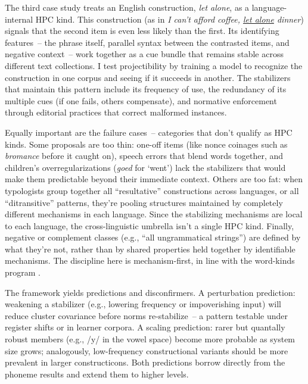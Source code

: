 \documentclass[12pt]{article}
\begin{document}
The third case study treats an English construction, \textit{let alone}, as a language-internal HPC kind. This construction (as in \textit{I can't afford coffee, \uline{let alone} dinner}) signals that the second item is even less likely than the first. Its identifying features~-- the phrase itself, parallel syntax between the contrasted items, and negative context~-- work together as a cue bundle that remains stable across different text collections. I test projectibility by training a model to recognize the construction in one corpus and seeing if it succeeds in another. The stabilizers that maintain this pattern include its frequency of use, the redundancy of its multiple cues (if one fails, others compensate), and normative enforcement through editorial practices that correct malformed instances.

Equally important are the failure cases~-- categories that don't qualify as HPC kinds. Some proposals are too thin: one-off items (like nonce coinages such as \textit{bromance} before it caught on), speech errors that blend words together, and children's overregularizations (\textit{goed} for `went') lack the stabilizers that would make them predictable beyond their immediate context. Others are too fat: when typologists group together all ``resultative'' constructions across languages, or all ``ditransitive'' patterns, they're pooling structures maintained by completely different mechanisms in each language. Since the stabilizing mechanisms are local to each language, the cross-linguistic umbrella isn't a single HPC kind. Finally, negative or complement classes (e.g., ``all ungrammatical strings'') are defined by what they're not, rather than by shared properties held together by identifiable mechanisms. The discipline here is mechanism-first, in line with the word-kinds program \citep{Miller2021WordsSpeciesKinds}.

The framework yields predictions and disconfirmers. A perturbation prediction: weakening a stabilizer (e.g., lowering frequency or impoverishing input) will reduce cluster covariance before norms re-stabilize~-- a pattern testable under register shifts or in learner corpora. A scaling prediction: rarer but quantally robust members (e.g., /y/ in the vowel space) become more probable as system size grows; analogously, low-frequency constructional variants should be more prevalent in larger constructicons. Both predictions borrow directly from the phoneme results \citep[Fig.\,2 p.\,7]{Ekstrom2025PhonemeTool} and extend them to higher levels.
\end{document}
